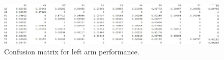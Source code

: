 \documentclass{sig-alternate}
\begin{document}






\begin{figure}[bp]
\begin{center}
  \includegraphics[width=1.0\linewidth]{visual_results/nConfkNN_left.jpg}
\end{center}
  \caption{Confusion matrix for left arm performance.}
  \label{fig:conf_left}
\end{figure}
\end{document}
